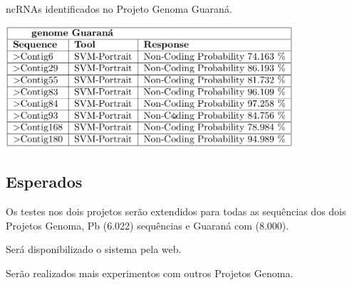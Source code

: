 \begin{table}[htb!]
\caption{ncRNAs identificados no Projeto Genoma Guaraná.} \label{fig:ResulProjGuarana}
\centering
\includegraphics[angle=0,width=0.8\textwidth]{imagens//fig1.JPEG}
\end{table}


\subsection{Esperados} \label{sec:Resulobter}

Os testes nos dois projetos serão extendidos para todas as sequências dos dois Projetos Genoma, Pb (6.022) sequências e Guaraná com (8.000).

Será disponibilizado o sistema pela web.

Serão realizados mais experimentos com outros Projetos Genoma.



